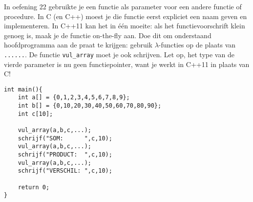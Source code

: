
\beginoef
In oefening 22 gebruikte je een functie als parameter voor een andere functie of procedure. In C (en C++) moest je die functie eerst expliciet een naam geven en implementeren.
In C++11 kan het in \'e\'en moeite: als het functievoorschrift klein genoeg is, maak je de functie on-the-fly aan. Doe dit om onderstaand  
hoofdprogramma aan de praat te krijgen: gebruik $\lambda$-functies
op de plaats van \verb}......}. De functie \verb}vul_array} moet je ook schrijven. 
Let op, het type van de vierde parameter is nu geen functiepointer, want je werkt in C++11 in plaats van C!
\begin{footnotesize}
\begin{verbatim}
int main(){
    int a[] = {0,1,2,3,4,5,6,7,8,9};
    int b[] = {0,10,20,30,40,50,60,70,80,90};
    int c[10];
		
    vul_array(a,b,c,...);
    schrijf("SOM:      ",c,10);
    vul_array(a,b,c,...);	
    schrijf("PRODUCT:  ",c,10);
    vul_array(a,b,c,...);
    schrijf("VERSCHIL: ",c,10);
	
    return 0;
}
\end{verbatim}
\end{footnotesize}

\endoef

